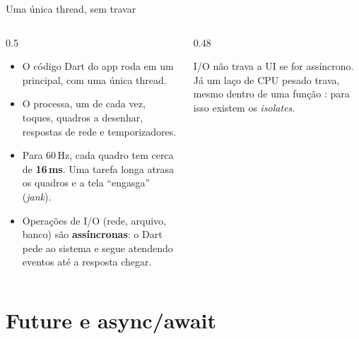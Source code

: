 \documentclass[aspectratio=169,10pt]{beamer}
\begin{document}
\begin{frame}{Uma única thread, sem travar}
  \begin{columns}[c]
    \begin{column}{0.5\textwidth}
      \small
      \begin{itemize}
        \item O código Dart do app roda em um  principal, com uma única thread.
        \item O  processa, um de cada vez, toques, quadros a desenhar, respostas de rede e temporizadores.
        \item Para 60\,Hz, cada quadro tem cerca de \textbf{16\,ms}. Uma tarefa longa atrasa os quadros e a tela ``engasga'' (\emph{jank}).
        \item Operações de I/O (rede, arquivo, banco) são \textbf{assíncronas}: o Dart pede ao sistema e segue atendendo eventos até a resposta chegar.
      \end{itemize}
    \end{column}
    \begin{column}{0.48\textwidth}
      \centering
      \begin{atencao}
        I/O não trava a UI se for assíncrono. Já um laço de CPU pesado trava, mesmo dentro de uma função : para isso existem os \emph{isolates}.
      \end{atencao}
    \end{column}
  \end{columns}
\end{frame}

\section{Future e async/await}
\end{document}
